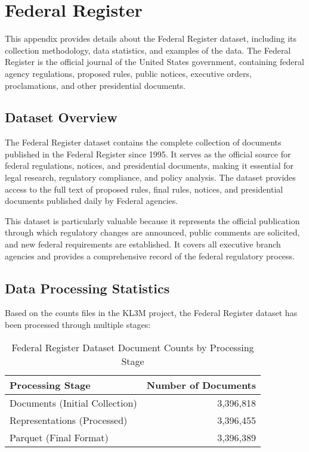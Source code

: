 \section{Federal Register}
\label{appendix:fr}

This appendix provides details about the Federal Register dataset, including its collection methodology, data statistics, and examples of the data. The Federal Register is the official journal of the United States government, containing federal agency regulations, proposed rules, public notices, executive orders, proclamations, and other presidential documents.

\subsection{Dataset Overview}

The Federal Register dataset contains the complete collection of documents published in the Federal Register since 1995. It serves as the official source for federal regulations, notices, and presidential documents, making it essential for legal research, regulatory compliance, and policy analysis. The dataset provides access to the full text of proposed rules, final rules, notices, and presidential documents published daily by Federal agencies.

This dataset is particularly valuable because it represents the official publication through which regulatory changes are announced, public comments are solicited, and new federal requirements are established. It covers all executive branch agencies and provides a comprehensive record of the federal regulatory process.

\subsection{Data Processing Statistics}

Based on the counts files in the KL3M project, the Federal Register dataset has been processed through multiple stages:

\begin{table}[h]
\centering
\begin{tabular}{|l|r|}
\hline
\textbf{Processing Stage} & \textbf{Number of Documents} \\
\hline
Documents (Initial Collection) & 3,396,818 \\
Representations (Processed) & 3,396,455 \\
Parquet (Final Format) & 3,396,389 \\
\hline
\end{tabular}
\caption{Federal Register Dataset Document Counts by Processing Stage}
\label{tab:fr_counts}
\end{table}

